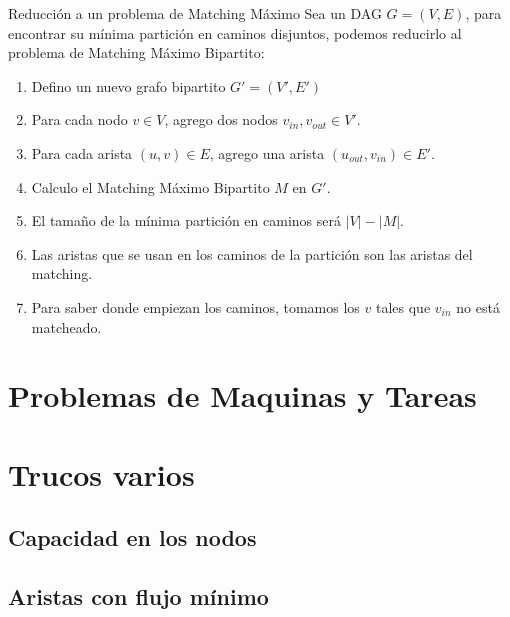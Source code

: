 \documentclass{beamer}
\begin{document}
    \begin{frame}{Reducción a un problema de Matching Máximo}
        Sea un DAG $G = (V,E)$, para encontrar su mínima partición en caminos disjuntos, podemos reducirlo al problema de Matching Máximo Bipartito:
        \begin{enumerate}
            \item Defino un nuevo grafo bipartito $G' = (V', E')$
            \item Para cada nodo $v \in V$, agrego dos nodos $v_{in}, v_{out} \in V'$.
            \pause
            \item Para cada arista $(u,v) \in E$, agrego una arista $(u_{out}, v_{in}) \in E'$. 
            \pause
            \item Calculo el Matching Máximo Bipartito $M$ en $G'$.
            \item El tamaño de la mínima partición en caminos será $|V|-|M|$.
            \pause
            \item Las aristas que se usan en los caminos de la partición son las aristas del matching.
            \item Para saber donde empiezan los caminos, tomamos los $v$ tales que $v_{in}$ no está matcheado.
        \end{enumerate}    
        

    \end{frame}
\section{Problemas de Maquinas y Tareas}

\section{ Trucos varios }
    \subsection{ Capacidad en los nodos }
    \subsection{ Aristas con flujo mínimo }
    
\end{document}
